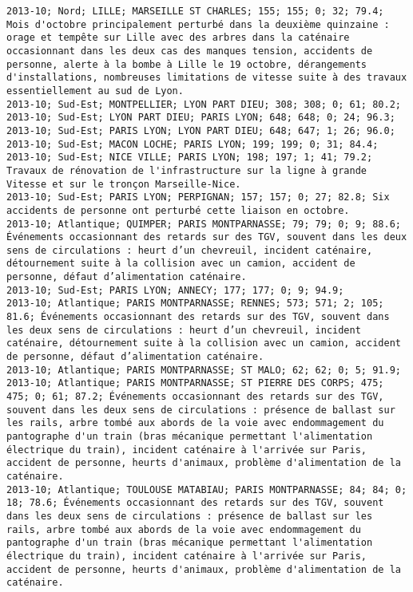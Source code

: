 \documentclass{article}
\begin{document}
\begin{Verbatim}[commandchars=\\\{\}]
2013-10; Nord; LILLE; MARSEILLE ST CHARLES; 155; 155; 0; 32; 79.4; Mois d'octobre principalement perturbé dans la deuxième quinzaine : orage et tempête sur Lille avec des arbres dans la caténaire occasionnant dans les deux cas des manques tension, accidents de personne, alerte à la bombe à Lille le 19 octobre, dérangements d'installations, nombreuses limitations de vitesse suite à des travaux essentiellement au sud de Lyon.
2013-10; Sud-Est; MONTPELLIER; LYON PART DIEU; 308; 308; 0; 61; 80.2; 
2013-10; Sud-Est; LYON PART DIEU; PARIS LYON; 648; 648; 0; 24; 96.3; 
2013-10; Sud-Est; PARIS LYON; LYON PART DIEU; 648; 647; 1; 26; 96.0; 
2013-10; Sud-Est; MACON LOCHE; PARIS LYON; 199; 199; 0; 31; 84.4; 
2013-10; Sud-Est; NICE VILLE; PARIS LYON; 198; 197; 1; 41; 79.2; Travaux de rénovation de l'infrastructure sur la ligne à grande Vitesse et sur le tronçon Marseille-Nice.
2013-10; Sud-Est; PARIS LYON; PERPIGNAN; 157; 157; 0; 27; 82.8; Six accidents de personne ont perturbé cette liaison en octobre.
2013-10; Atlantique; QUIMPER; PARIS MONTPARNASSE; 79; 79; 0; 9; 88.6; Événements occasionnant des retards sur des TGV, souvent dans les deux sens de circulations : heurt d’un chevreuil, incident caténaire, détournement suite à la collision avec un camion, accident de personne, défaut d’alimentation caténaire.
2013-10; Sud-Est; PARIS LYON; ANNECY; 177; 177; 0; 9; 94.9; 
2013-10; Atlantique; PARIS MONTPARNASSE; RENNES; 573; 571; 2; 105; 81.6; Événements occasionnant des retards sur des TGV, souvent dans les deux sens de circulations : heurt d’un chevreuil, incident caténaire, détournement suite à la collision avec un camion, accident de personne, défaut d’alimentation caténaire.
2013-10; Atlantique; PARIS MONTPARNASSE; ST MALO; 62; 62; 0; 5; 91.9; 
2013-10; Atlantique; PARIS MONTPARNASSE; ST PIERRE DES CORPS; 475; 475; 0; 61; 87.2; Événements occasionnant des retards sur des TGV, souvent dans les deux sens de circulations : présence de ballast sur les rails, arbre tombé aux abords de la voie avec endommagement du pantographe d'un train (bras mécanique permettant l'alimentation électrique du train), incident caténaire à l'arrivée sur Paris, accident de personne, heurts d'animaux, problème d'alimentation de la caténaire.
2013-10; Atlantique; TOULOUSE MATABIAU; PARIS MONTPARNASSE; 84; 84; 0; 18; 78.6; Événements occasionnant des retards sur des TGV, souvent dans les deux sens de circulations : présence de ballast sur les rails, arbre tombé aux abords de la voie avec endommagement du pantographe d'un train (bras mécanique permettant l'alimentation électrique du train), incident caténaire à l'arrivée sur Paris, accident de personne, heurts d'animaux, problème d'alimentation de la caténaire.

\end{Verbatim}
\end{document}
